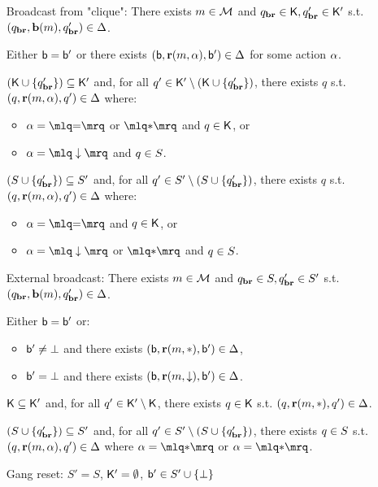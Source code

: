 \begin{definition}
\begin{enumerate}
	\item[Broadcast from "clique":] There exists $m \in \mathcal{M}$ and $q_{\textbf{br}} \in \mathsf{K}, q'_{\textbf{br}} \in \mathsf{K}'$ s.t. $(q_{\textbf{br}}, \textbf{b}(m), q'_{\textbf{br}}) \in \Delta$. 
	
	Either $\mathsf{b} = \mathsf{b}'$ or there exists $(\mathsf{b}, \textbf{r}(m, \alpha), \mathsf{b}') \in \Delta$ for some action $\alpha$.

	$(\mathsf{K} \cup \{q'_{\textbf{br}}\}) \subseteq \mathsf{K}'$ and, for all $q' \in \mathsf{K}' \setminus (\mathsf{K} \cup \{q'_{\textbf{br}}\})$, there exists $q$ s.t. $(q, \textbf{r}(m, \alpha), q') \in \Delta$ where:
	\begin{itemize}
		\item $\anact = \quotemarks{\eqtestact}$ or $\quotemarks{\dummyact}$ and $q \in \mathsf{K}$, or
		\item $\anact= \quotemarks{\enregact}$ and $q \in S$.
	\end{itemize}
	
	 $(S \cup \{q'_{\textbf{br}}\}) \subseteq S'$ and, for all $q' \in S' \setminus (S \cup \{q'_{\textbf{br}}\})$, there exists $q$ s.t. $(q, \textbf{r}(m, \alpha), q') \in \Delta$ where:
	\begin{itemize}
		\item  $\anact = \quotemarks{\eqtestact}$ and $q \in \mathsf{K}$, or
		\item $\anact = \quotemarks{\enregact}$ or $\quotemarks{\dummyact}$ and $q \in S$.
	\end{itemize}
	\item[External broadcast:] There exists $m \in \mathcal{M}$ and $q_{\textbf{br}} \in S, q'_{\textbf{br}} \in S'$ s.t. $(q_{\textbf{br}}, \textbf{b}(m), q'_{\textbf{br}}) \in \Delta$. 
	
	Either $\mathsf{b} = \mathsf{b}'$ or:
	\begin{itemize} 
		\item $\mathsf{b}' \ne \bot$ and there exists $(\mathsf{b}, \textbf{r}(m, {*}), \mathsf{b}') \in \Delta$, 
		\item $\mathsf{b}' = \bot$ and there exists $(\mathsf{b}, \textbf{r}(m, \downarrow), \mathsf{b}') \in \Delta$.
	\end{itemize}

	$\mathsf{K} \subseteq \mathsf{K}'$ and, for all $q' \in \mathsf{K}' \setminus \mathsf{K}$, there exists $q \in \mathsf{K}$ s.t. $(q, \textbf{r}(m, {*}), q') \in \Delta$.
	
	 $(S \cup \{q'_{\textbf{br}}\}) \subseteq S'$ and, for all $q' \in S' \setminus (S \cup \{q'_{\textbf{br}}\})$, there exists $q \in S$ s.t. $(q, \textbf{r}(m, \alpha), q') \in \Delta$ where $\anact = \quotemarks{\dummyact}$ or $\anact = \quotemarks{\dummyact}$.
	\item[Gang reset:] $S' = S$, $\mathsf{K}' = \emptyset$, $\mathsf{b}' \in S' \cup \{\bot\}$
\end{enumerate}



\end{definition}
